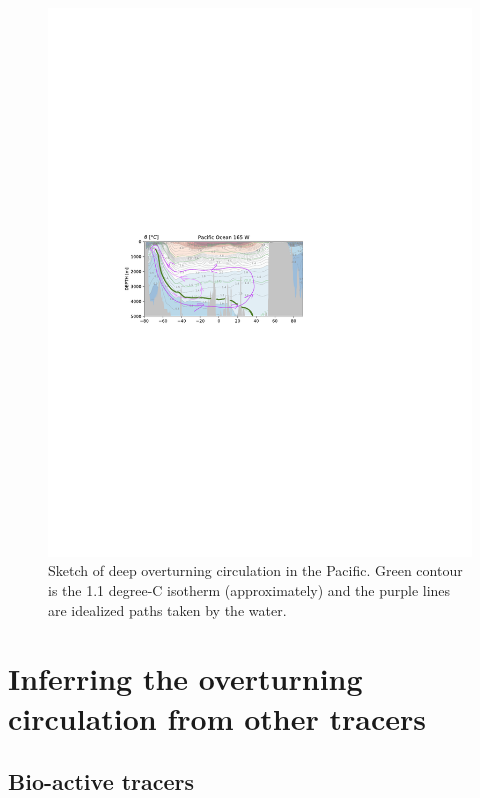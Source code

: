 \begin{figure}[hbt]
  \begin{center}
    \includegraphics{figs/WaterMasses/AnnotatePacific}
    \caption{Sketch of deep overturning circulation in the Pacific.  Green contour is the 1.1 degree-C isotherm (approximately) and the purple lines are idealized paths taken by the water.}
    \label{fig:AnnotatePacific}  
  \end{center}
\end{figure}



\section{Inferring the overturning circulation from other tracers}

\subsection{Bio-active tracers}

